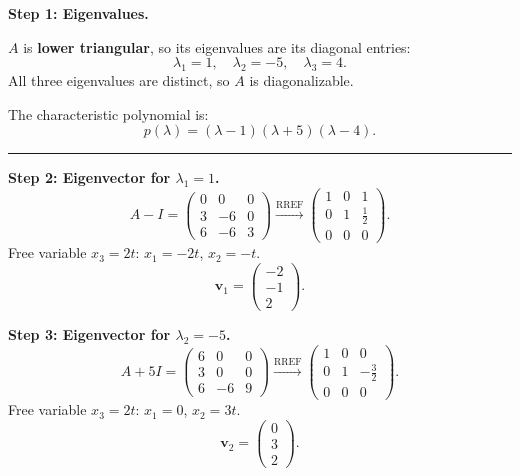 \documentclass[12pt,a3paper]{article}
\begin{document}
\begin{tcolorbox}[enhanced,breakable,
  colback=cE!4,colframe=cE,boxrule=0.8pt,arc=5pt,
  title={\textbf{Answer --- Eigenvalues \& Eigenvectors of
    $A=\begin{pmatrix}1&0&0\\3&-5&0\\6&-6&4\end{pmatrix}$}},
  fonttitle=\bfseries\color{white},colbacktitle=cE]
 
\textbf{Step 1: Eigenvalues.}
 
$A$ is \textbf{lower triangular}, so its eigenvalues are its diagonal entries:
\[
  \boxed{\lambda_1 = 1, \quad \lambda_2 = -5, \quad \lambda_3 = 4.}
\]
All three eigenvalues are distinct, so $A$ is diagonalizable.
 
The characteristic polynomial is:
\[
  p(\lambda) = (\lambda-1)(\lambda+5)(\lambda-4).
\]
 
\medskip\textcolor{cE}{\rule{\textwidth}{0.4pt}}
 
\textbf{Step 2: Eigenvector for $\lambda_1 = 1$.}
\[
  A - I = \begin{pmatrix}0&0&0\\3&-6&0\\6&-6&3\end{pmatrix}
  \xrightarrow{\text{RREF}}
  \begin{pmatrix}1&0&1\\0&1&\frac{1}{2}\\0&0&0\end{pmatrix}.
\]
Free variable $x_3 = 2t$: $x_1 = -2t$, $x_2 = -t$.
\[
  \mathbf{v}_1 = \begin{pmatrix}-2\\-1\\2\end{pmatrix}.
\]
 
\textbf{Step 3: Eigenvector for $\lambda_2 = -5$.}
\[
  A + 5I = \begin{pmatrix}6&0&0\\3&0&0\\6&-6&9\end{pmatrix}
  \xrightarrow{\text{RREF}}
  \begin{pmatrix}1&0&0\\0&1&-\frac{3}{2}\\0&0&0\end{pmatrix}.
\]
Free variable $x_3 = 2t$: $x_1 = 0$, $x_2 = 3t$.
\[
  \mathbf{v}_2 = \begin{pmatrix}0\\3\\2\end{pmatrix}.
\]
 

\end{tcolorbox}
\end{document}
